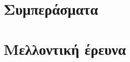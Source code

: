 \chapter{Συμπεράσματα}
  \label{part:03:chapter:01}
  

\chapter{Μελλοντική έρευνα}
  \label{part:03:chapter:02}
  
